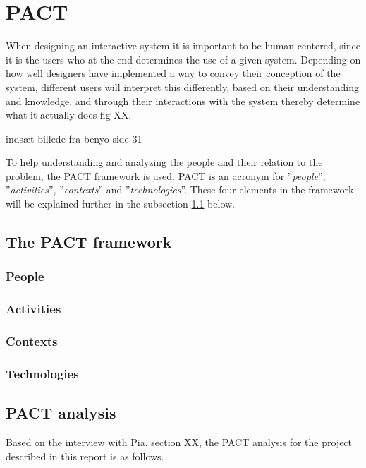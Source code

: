 \section{PACT}\label{sec:PACT}
When designing an interactive system it is important to be human-centered, since it is the users who at the end determines the use of a given system.
Depending on how well designers have implemented a way to convey their conception of the system, different users will interpret this differently, based on their understanding and knowledge, and through their interactions with the system thereby determine what it actually does {\color{red}fig XX}.

{\color{red}indsæt billede fra benyo side 31}

To help understanding and analyzing the people and their relation to the problem, the PACT framework is used.
PACT is an acronym for ''{\itshape{people}}'', ''{\itshape{activities}}'', ''{\itshape{contexts}}'' and ''{\itshape{technologies}}''.
These four elements in the framework will be explained further in the subsection \ref{sec:PACT-framework} below.

\subsection{The PACT framework}\label{sec:PACT-framework}
\subsubsection*{People}

\subsubsection*{Activities}

\subsubsection*{Contexts}

\subsubsection*{Technologies}


\subsection{PACT analysis}\label{sec:PACT-analysis}
Based on the interview 
with Pia,
{\color{red} section XX}, the PACT analysis for the project described in this report is as follows.

